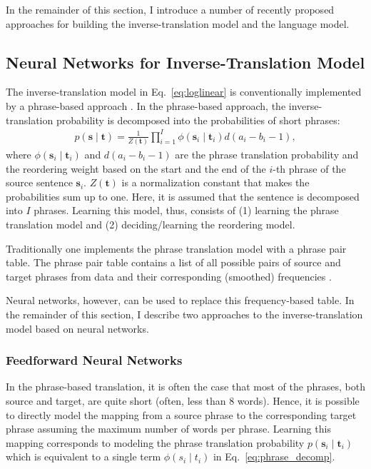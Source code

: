 \documentclass[11pt, oneside]{essay}
\newcommand{\vect}[1]{\mathbf{#1}}
\newcommand{\vs}[0]{\vect{s}}
\newcommand{\vt}[0]{\vect{t}}
\newcommand{\tred}[1]{\textcolor{red}{#1}}
\begin{document}
In the remainder of this section, I introduce a number of
recently proposed approaches for building the
inverse-translation model and the language model.

\subsection{Neural Networks for Inverse-Translation Model}
\label{sec:nntm}

The inverse-translation model in Eq.~\eqref{eq:loglinear} is conventionally
implemented by a phrase-based approach \citep[see,
e.g.,][]{Koehn2003,Marcu2002}.  In the phrase-based approach, the
inverse-translation probability is decomposed into the
probabilities of short phrases:
\begin{align}
\label{eq:phrase_decomp}
    p(\vs \mid \vt) = \frac{1}{Z(\vt)} \prod_{i=1}^{I} \phi(\vs_i \mid \vt_i) d(a_i -
    b_i -1),
\end{align}
where $\phi(\vs_i \mid \vt_i)$ and $d(a_i - b_i - 1)$ are the
phrase translation probability and the reordering weight based on
the start and the end of the $i$-th phrase of the source sentence
$\vs_i$. $Z(\vt)$ is a normalization constant that makes the
probabilities sum up to one. Here, it is assumed that the
sentence is decomposed into $I$ phrases. Learning this model,
thus, consists of (1) learning the phrase translation model and
(2) deciding/learning the reordering model.  

Traditionally one implements the phrase translation
model with a phrase pair table. The phrase pair table contains a
list of all possible pairs of source and target phrases from data
and their corresponding (smoothed) frequencies \citep[see,
e.g.,][]{Koehn2003,Koehn2010}. 

Neural networks, however, can be used to replace this
frequency-based table. In the remainder of this section, I
describe two approaches to the inverse-translation model based on
neural networks.

\subsubsection{Feedforward Neural Networks}

In the phrase-based translation, it is often the case that most
of the phrases, both source and target, are quite short (often,
        less than $8$ words). Hence, it is possible to directly
model the mapping from a source phrase to the corresponding
target phrase assuming the maximum number of words per phrase.
Learning this mapping corresponds to modeling the phrase
translation probability $p(\vs_i \mid \vt_i)$ which is equivalent to
a single term $\phi(s_i \mid t_i)$ in
Eq.~\eqref{eq:phrase_decomp}.
\end{document}
